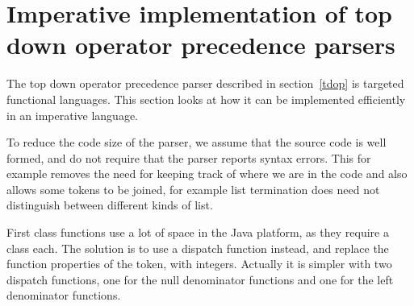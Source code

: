 \documentclass[11pt]{report}
\begin{document}
\begin{comment}
\subsection{* Implemented parts of EcmaScript, and strictness}
This first implementation of LightScript will not try to implement as much of EcmaScript as possible, but rather implement enough such that it is useful, and avoid parts of the language that is considered bad style.

EcmaScript it has objects with prototypical inheritance, but instead of a self like clone operator\cite{See section~\ref{survey-self}}, it adds some apparantly Java inspired syntax with a \verb|new| operator, coupled with a special prototype property.
Instead of the Java inspired \verb|new| syntax for instantiation, LightScript just supports objects inheritance the clone operator, which can easily be implemented in pure EcmaScript as well.

\subsection{*Design choices and differences from EcmaScript/JavaScript}

\subsection{*Scoping and stack}

LightScript should have static scope, in a way similar to EcmaScript. 

\end{comment}
\section{Imperative implementation of top down operator precedence parsers}
The top down operator precedence parser described in section~\ref{tdop} is targeted functional languages.
This section looks at how it can be implemented efficiently in an imperative language.

To reduce the code size of the parser, we assume that the source code is well formed, and do not require that the parser reports syntax errors. This for example removes the need for keeping track of where we are in the code and also allows some tokens to be joined, for example list termination does need not distinguish between different kinds of list.

First class functions use a lot of space in the Java platform, as they require a class each.
The solution is to use a dispatch function instead, and replace the function properties of the token, with integers.
Actually it is simpler with two dispatch functions, one for the null denominator functions and one for the left denominator functions.
\end{document}
